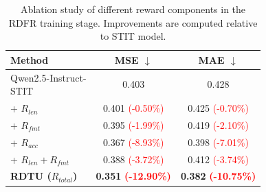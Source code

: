 \begin{table}[t]
    \centering
    \caption{Ablation study of different reward components in the RDFR
    training stage. Improvements are computed relative to STIT model.}
    \label{tab:ablation_02}

    \vspace{-5pt}

    \newcommand{\imp}[1]{{\textcolor{red}{(#1)}}}
    \newcommand{\bimp}[1]{{\textbf{\textcolor{red}{(#1)}}}}

    \begin{tabular}{lcc}
        \toprule
        \textbf{Method}
        & \textbf{MSE} $\downarrow$
        & \textbf{MAE} $\downarrow$ \\
        \midrule
        \shortstack[l]{Qwen2.5-Instruct-\\STIT}
        & 0.403 & 0.428 \\
        \midrule
        + $R_{len}$
        & 0.401 \imp{-0.50\%}
        & 0.425 \imp{-0.70\%} \\
        + $R_{fmt}$
        & 0.395 \imp{-1.99\%}
        & 0.419 \imp{-2.10\%} \\
        + $R_{acc}$
        & 0.367 \imp{-8.93\%}
        & 0.398 \imp{-7.01\%} \\
        + $R_{len} + R_{fmt}$
        & 0.388 \imp{-3.72\%}
        & 0.412 \imp{-3.74\%} \\
        \midrule
        \textbf{RDTU ($R_{total}$)}
        & \textbf{0.351} \bimp{-12.90\%}
        & \textbf{0.382} \bimp{-10.75\%} \\
        \bottomrule
    \end{tabular}
    \vspace{-12pt}
\end{table}
